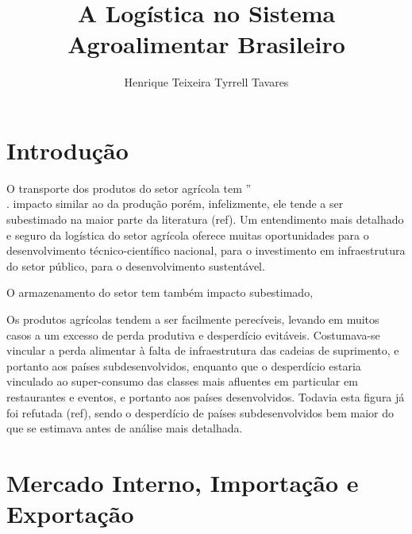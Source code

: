 \documentclass[]{article}
\title{A Logística no Sistema Agroalimentar Brasileiro}
\author{Henrique Teixeira Tyrrell Tavares}
\begin{document}
	
	\maketitle
	
	\begin{abstract}
		
	\end{abstract}
	
	\section{Introdução}

		O transporte dos produtos do setor agrícola tem ''\\
														
														
														
														
															
															
															
														
														
															
															
															
															
															
															
																																																																										.	impacto similar ao da produção porém, infelizmente, ele tende a ser subestimado na maior parte da literatura (ref). Um entendimento mais detalhado e seguro da logística do setor agrícola oferece muitas oportunidades para o desenvolvimento técnico-científico nacional, para o investimento em infraestrutura do setor público, para o desenvolvimento sustentável.
		
		O armazenamento do setor tem também impacto subestimado, 
		
		Os produtos agrícolas tendem a ser facilmente perecíveis, levando em muitos casos a um excesso de perda produtiva e desperdício evitáveis. Costumava-se vincular a perda alimentar à falta de infraestrutura das cadeias de suprimento, e portanto aos países subdesenvolvidos, enquanto que o desperdício estaria vinculado ao super-consumo das classes mais afluentes em particular em restaurantes e eventos, e portanto aos países desenvolvidos. Todavia esta figura já foi refutada (ref), sendo o desperdício de países subdesenvolvidos bem maior do que se estimava antes de análise mais detalhada. 
	
	\section{Mercado Interno, Importação e Exportação}
	
\end{document}
